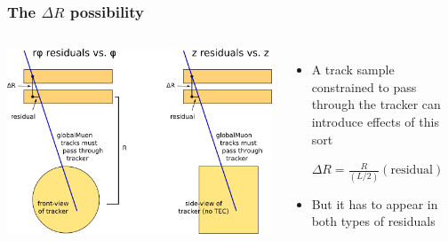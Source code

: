 \documentclass[compress]{beamer}
\begin{document}
\begin{frame}
\frametitle{The $\Delta R$ possibility}

\begin{columns}
\includegraphics[width=\linewidth]{z_explanation.png}

\begin{itemize}
\item A track sample constrained to pass through the tracker can introduce effects of this sort

\vspace{0.2 cm}
\mbox{\hspace{-1 cm}$\displaystyle \Delta R = \frac{R}{(L/2)} \left(\mbox{residual}\right)$\hspace{-1 cm}}

\vspace{0.1 cm}
\item But it has to appear in both types of residuals
\end{itemize}
\end{columns}
\end{frame}
\end{document}
